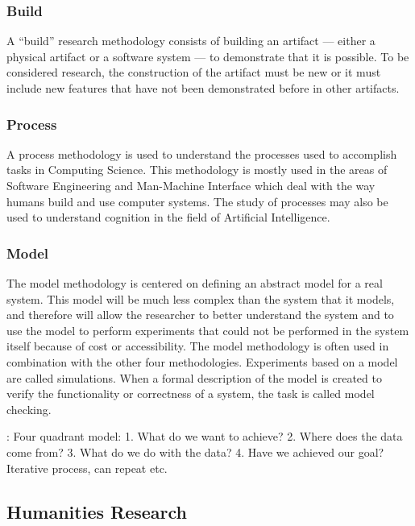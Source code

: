 \subsubsection*{Build}

A ``build'' research methodology consists of building an artifact — either a physical artifact or a software system — to demonstrate that it is possible. To be considered research, the construction of the artifact must be new or it must include new features that have not been demonstrated before in other artifacts. \autocite{Amaral}

\subsubsection*{Process}

A process methodology is used to understand the processes used to accomplish tasks in Computing Science. This methodology is mostly used in the areas of Software Engineering and Man-Machine Interface which deal with the way humans build and use computer systems. The study of processes may also be used to understand cognition in the field of Artificial Intelligence. \autocite{Amaral}

\subsubsection*{Model}

The model methodology is centered on defining an abstract model for a real system. This model will be much less complex than the system that it models, and therefore will allow the researcher to better understand the system and to use the model to perform experiments that could not be performed in the system itself because of cost or accessibility. The model methodology is often used in combination with the other four methodologies. Experiments based on a model are called simulations. When a formal description of the model is created to verify the functionality or correctness of a system, the task is called model checking. \autocite{Amaral}

\autocite{Holz2006}:
Four quadrant model:
1.	What do we want to achieve?
2.	Where does the data come from?
3.	What do we do with the data?
4.	Have we achieved our goal?
Iterative process, can repeat etc.


\subsection{Humanities Research}

